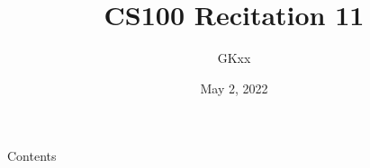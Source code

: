 \documentclass{beamer}
\title{CS100 Recitation 11}
\author{GKxx}
\date{May 2, 2022}
\begin{document}
\begin{frame}
    \maketitle
\end{frame}

\begin{frame}{Contents}
    \tableofcontents
\end{frame}










\end{document}
